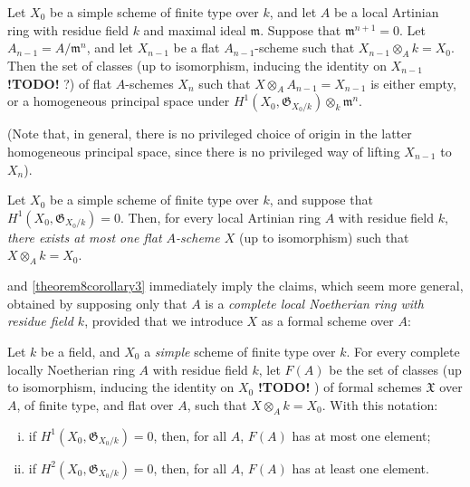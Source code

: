 \documentclass{article}
\theoremstyle{plain}
\newenvironment{theorem}[1]
  {\renewcommand\theinnercustomtheorem{#1}\innercustomtheorem}
  {\endinnercustomtheorem}
\newenvironment{corollary}[1]
  {\renewcommand\theinnercustomcorollary{#1}\innercustomcorollary}
  {\endinnercustomcorollary}
\theoremstyle{definition}
\newcommand{\fk}{\mathfrak}
\newcommand{\todo}{\textbf{ !TODO! }}
\newcommand{\oldpage}[1]{\marginpar{\footnotesize$\Big\vert$ \textit{p.~#1}}}
\begin{document}
\begin{corollary}{2}
\label{theorem8corollary2}
  Let $X_0$ be a simple scheme of finite type over $k$, and let $A$ be a local Artinian ring with residue field $k$ and maximal ideal $\fk{m}$.
  Suppose that $\fk{m}^{n+1}=0$.
  Let $A_{n-1}=A/\fk{m}^n$, and let $X_{n-1}$ be a flat $A_{n-1}$-scheme such that $X_{n-1}\otimes_Ak=X_0$.
  Then the set of classes (up to isomorphism, inducing the identity on $X_{n-1}$ \todo?) of flat $A$-schemes $X_n$ such that $X\otimes_AA_{n-1}=X_{n-1}$ is either empty, or a homogeneous principal space under $H^1(X_0,\fk{G}_{X_0/k})\otimes_k\fk{m}^n$.
\end{corollary}

(Note that, in general, there is no privileged choice of origin in the latter homogeneous principal space, since there is no privileged way of lifting $X_{n-1}$ to $X_n$).

\begin{corollary}{3}
\label{theorem8corollary3}
  Let $X_0$ be a simple scheme of finite type over $k$, and suppose that $H^1(X_0,\fk{G}_{X_0/k})=0$.
  Then, for every local Artinian ring $A$ with residue field $k$, \emph{there exists at most one flat $A$-scheme $X$} (up to isomorphism) such that $X\otimes_Ak=X_0$.
\end{corollary}

 and \cref{theorem8corollary3} immediately imply the claims, which seem more general, obtained by supposing only that $A$ is a \emph{complete local Noetherian ring with residue field $k$}, provided that we introduce $X$ as a formal scheme over $A$:

\begin{theorem}{9}
\label{theorem9}
  Let $k$ be a field, and $X_0$ a \emph{simple} scheme of finite type over $k$.
  For every complete locally Noetherian ring $A$ with residue field $k$, let $F(A)$ be the set of classes (up to isomorphism, inducing the identity on $X_0$ \todo)
\oldpage{182-14}
  of formal schemes $\fk{X}$ over $A$, of finite type, and flat over $A$, such that $X\otimes_Ak=X_0$.
  With this notation:
  \begin{enumerate}[i.]
    \item if $H^1(X_0,\fk{G}_{X_0/k})=0$, then, for all $A$, $F(A)$ has at most one element;
    \item if $H^2(X_0,\fk{G}_{X_0/k})=0$, then, for all $A$, $F(A)$ has at least one element.
  \end{enumerate}
\end{theorem}
\end{document}
